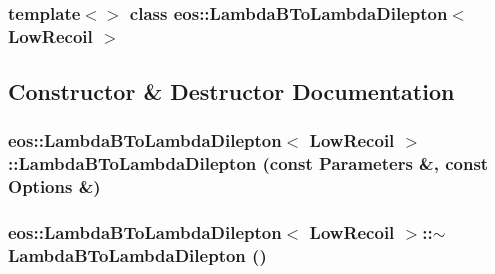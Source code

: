 \subsubsection*{template$<$$>$ class eos::LambdaBToLambdaDilepton$<$ LowRecoil $>$}



\subsection{Constructor \& Destructor Documentation}
\hypertarget{classeos_1_1LambdaBToLambdaDilepton_3_01LowRecoil_01_4_a53eff2dfb29006c924132c927443d895}{
\subsubsection[{LambdaBToLambdaDilepton}]{\setlength{\rightskip}{0pt plus 5cm}eos::LambdaBToLambdaDilepton$<$ {\bf LowRecoil} $>$::LambdaBToLambdaDilepton (const {\bf Parameters} \&, \/  const {\bf Options} \&)}}
\label{classeos_1_1LambdaBToLambdaDilepton_3_01LowRecoil_01_4_a53eff2dfb29006c924132c927443d895}
\hypertarget{classeos_1_1LambdaBToLambdaDilepton_3_01LowRecoil_01_4_a71cb75b13d5959d2ffe97eefb56f6b4f}{
\subsubsection[{$\sim$LambdaBToLambdaDilepton}]{\setlength{\rightskip}{0pt plus 5cm}eos::LambdaBToLambdaDilepton$<$ {\bf LowRecoil} $>$::$\sim$LambdaBToLambdaDilepton ()}}
\label{classeos_1_1LambdaBToLambdaDilepton_3_01LowRecoil_01_4_a71cb75b13d5959d2ffe97eefb56f6b4f}


